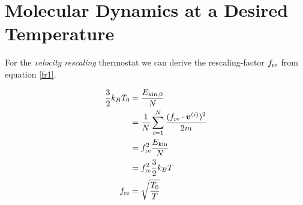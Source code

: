 \section{Molecular Dynamics at a Desired Temperature}

For the \emph{velocity rescaling} thermostat we can derive the rescaling-factor $f_\text{re}$ from equation \eqref{fr1}.

\begin{align}
\frac{3}{2}k_BT_0
	&= \frac{E_{\text{kin},0}}{N}
	\label{fr1}\\
&= \frac{1}{N}\sum_{i=1}^{N} \frac{(f_\text{re}\cdot\boldsymbol{v}^{(i)})^2}{2m}
	\label{fr2}\\
&= f_\text{re}^2\frac{E_\text{kin}}{N}
	\label{fr3}\\
&=f_\text{re}^2\frac{3}{2}k_BT
	\label{fr4}\\
f_\text{re}
	&= \sqrt{\frac{T_0}{T}}
	\label{fr5}
\end{align}

